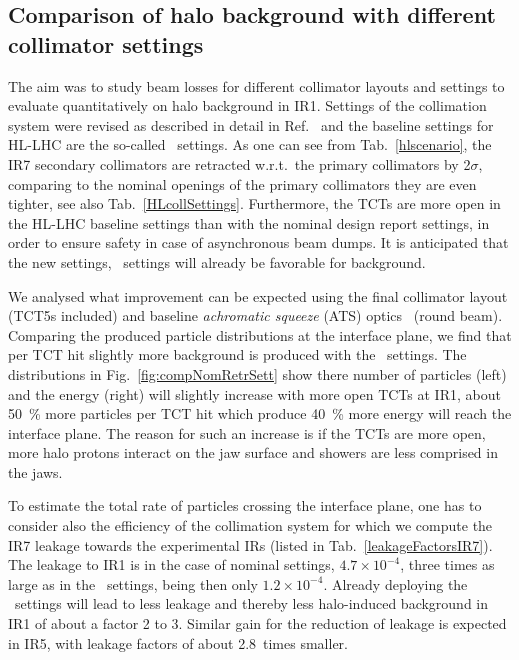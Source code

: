 \subsection{Comparison of halo background with different collimator settings}

The aim was to study beam losses for different collimator layouts and settings to evaluate quantitatively on halo background in IR1. Settings of the collimation system were revised as described in detail in Ref.~\cite{collSettRef} and the baseline settings for HL-LHC are the so-called \twosigmaret~settings. As one can see from Tab.~\ref{hlscenario}, the IR7 secondary collimators are retracted w.r.t.~the primary collimators by 2$\sigma$, comparing to the nominal openings of the primary collimators they are even tighter, see also Tab.~\ref{HLcollSettings}. Furthermore, the TCTs are more open in the HL-LHC baseline settings than with the nominal design report settings, in order to ensure safety in case of asynchronous beam dumps. It is anticipated that the new settings, \twosigmaret~settings will already be favorable for background.

We analysed what improvement can be expected using the final collimator layout (TCT5s included) and baseline \textit{achromatic squeeze} (ATS) optics~\cite{ATSref} (round beam). Comparing the produced particle distributions at the interface plane, we find that per TCT hit slightly more background is produced with the \twosigmaret~settings. The distributions in Fig.~\ref{fig:compNomRetrSett} show there number of particles (left) and the energy (right) will slightly increase with more open TCTs at IR1, about 50~\% more particles per TCT hit which produce 40~\% more energy will reach the interface plane. The reason for such an increase is if the TCTs are more open, more halo protons interact on the jaw surface and showers are less comprised in the jaws. %

To estimate the total rate of particles crossing the interface plane, one has to consider also the efficiency of the collimation system for which we compute the IR7 leakage towards the experimental IRs (listed in Tab.~\ref{leakageFactorsIR7}). The leakage to IR1 is in the case of nominal settings, $4.7 \times 10^{-4}$, three times as large as in the \twosigmaret~settings, being then only $1.2 \times 10^{-4}$. Already deploying the \twosigmaret~settings will lead to less leakage and thereby less halo-induced background in IR1 of about a factor 2 to 3. Similar gain for the reduction of leakage is expected in IR5, with leakage factors of about 2.8~times smaller.



